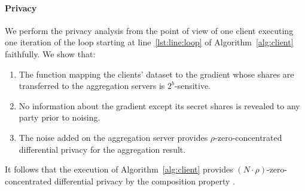 \documentclass{article}
\begin{document}
\paragraph{Privacy}
We perform the privacy analysis from the point of view of one client executing one iteration of the loop starting at line~\ref{lst:line:loop} of Algorithm~\ref{alg:client} faithfully. We show that:
\begin{enumerate}
\item The function mapping the clients' dataset to the gradient whose shares are transferred to the aggregation servers is $2^b$-sensitive.
\item No information about the gradient except its secret shares is revealed to any party prior to noising.
\item The noise added on the aggregation server provides $\rho$-zero-concentrated differential privacy for the aggregation result.
\end{enumerate}
It follows that the execution of Algorithm~\ref{alg:client} provides $(N\cdot\rho)$-zero-concentrated differential privacy by the composition property \cite[Lemma~1.8 on page 7]{DBLP:journals/corr/BunS16}.
\end{document}

